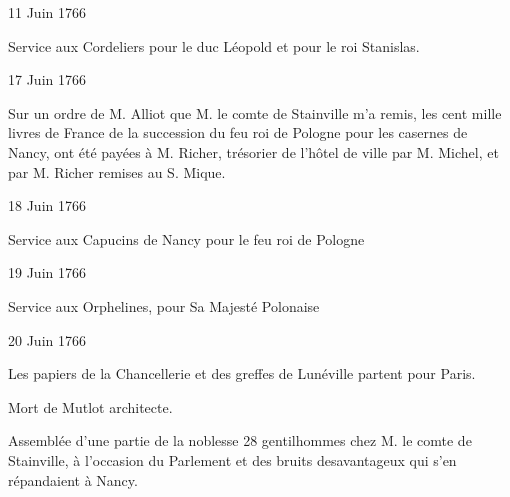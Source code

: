                     \begin{diary}{11 Juin 1766}{}

                         Service aux Cordeliers pour le duc Léopold
                           et pour le roi Stanislas.
                        \bigskip


                     \end{diary}

                     \begin{diary}{17 Juin 1766}{}

                         Sur un ordre de M. Alliot que M.
                              le comte de
                              Stainville m'a remis, les cent mille livres de France
                           de la succession du feu roi de Pologne pour les casernes
                              de Nancy, ont été payées à M.
                              Richer, trésorier
                           de l'hôtel de ville par M. Michel, et par M.
                              Richer remises au S.
                              Mique. \bigskip


                     \end{diary}

                     \begin{diary}{18 Juin 1766}{}

                         Service aux Capucins de Nancy pour le
                              feu roi de Pologne
                        \bigskip


                     \end{diary}

                     \begin{diary}{19 Juin 1766}{}

                         Service aux Orphelines, pour Sa Majesté Polonaise
                        \bigskip


                     \end{diary}

                     \begin{diary}{20 Juin 1766}{}

                         Les papiers de la Chancellerie et des greffes
                           de Lunéville partent pour
                              Paris. \bigskip


                         Mort de Mutlot architecte. \bigskip


                         Assemblée d'une partie de la noblesse 28 gentilhommes
                           chez
                           M. le comte de Stainville, à
                           l'occasion
                           du Parlement et des bruits
                           desavantageux
                           qui s'en répandaient à Nancy.
                        \bigskip


                     \end{diary}

